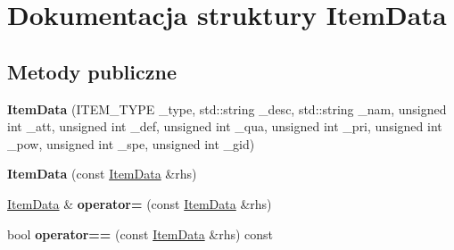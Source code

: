 \hypertarget{struct_item_data}{\section{Dokumentacja struktury Item\-Data}
\label{struct_item_data}
}
\subsection*{Metody publiczne}
\begin{DoxyCompactItemize}
\item 
\hypertarget{struct_item_data_a8ff460ef078580548de4405309678fe9}{{\bfseries Item\-Data} (I\-T\-E\-M\-\_\-\-T\-Y\-P\-E \-\_\-type, std\-::string \-\_\-desc, std\-::string \-\_\-nam, unsigned int \-\_\-att, unsigned int \-\_\-def, unsigned int \-\_\-qua, unsigned int \-\_\-pri, unsigned int \-\_\-pow, unsigned int \-\_\-spe, unsigned int \-\_\-gid)}\label{struct_item_data_a8ff460ef078580548de4405309678fe9}

\item 
\hypertarget{struct_item_data_a8d02934a6e2a1399eb80b6ee930b69d3}{{\bfseries Item\-Data} (const \hyperlink{struct_item_data}{Item\-Data} \&rhs)}\label{struct_item_data_a8d02934a6e2a1399eb80b6ee930b69d3}

\item 
\hypertarget{struct_item_data_a225fa8658908c97592b5fed58e361228}{\hyperlink{struct_item_data}{Item\-Data} \& {\bfseries operator=} (const \hyperlink{struct_item_data}{Item\-Data} \&rhs)}\label{struct_item_data_a225fa8658908c97592b5fed58e361228}

\item 
\hypertarget{struct_item_data_a2395fbbbfcf43da6092eebdf17aa23df}{bool {\bfseries operator==} (const \hyperlink{struct_item_data}{Item\-Data} \&rhs) const }\label{struct_item_data_a2395fbbbfcf43da6092eebdf17aa23df}

\end{DoxyCompactItemize}
